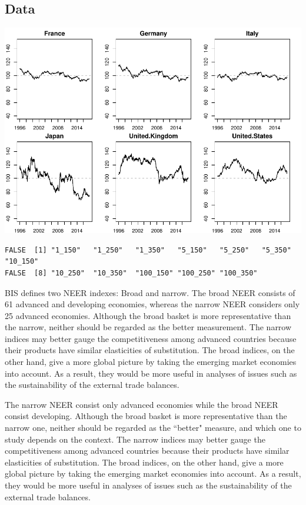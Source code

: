 \documentclass[]{elsarticle} %
\makeatletter
\def\maxwidth{\ifdim\Gin@nat@width>\linewidth\linewidth
\else\Gin@nat@width\fi}
\let\Oldincludegraphics\includegraphics
\renewcommand{\includegraphics}[1]{\Oldincludegraphics[width=\maxwidth]{#1}}
\makeatother
\begin{document}
\subsection{Data}\label{data}

\includegraphics{Main_files/figure-latex/unnamed-chunk-3-1.pdf}

\begin{verbatim}
FALSE  [1] "1_150"   "1_250"   "1_350"   "5_150"   "5_250"   "5_350"   "10_150" 
FALSE  [8] "10_250"  "10_350"  "100_150" "100_250" "100_350"
\end{verbatim}

BIS defines two NEER indexes: Broad and narrow. The broad NEER consists
of 61 advanced and developing economies, whereas the narrow NEER
considers only 25 advanced economies. Although the broad basket is more
representative than the narrow, neither should be regarded as the better
measurement. The narrow indices may better gauge the competitiveness
among advanced countries because their products have similar
elasticities of substitution. The broad indices, on the other hand, give
a more global picture by taking the emerging market economies into
account. As a result, they would be more useful in analyses of issues
such as the sustainability of the external trade balances.

The narrow NEER consist only advanced economies while the broad NEER
consist developing. Although the broad basket is more representative
than the narrow one, neither should be regarded as the ``better"
measure, and which one to study depends on the context. The narrow
indices may better gauge the competitiveness among advanced countries
because their products have similar elasticities of substitution. The
broad indices, on the other hand, give a more global picture by taking
the emerging market economies into account. As a result, they would be
more useful in analyses of issues such as the sustainability of the
external trade balances.
\end{document}
